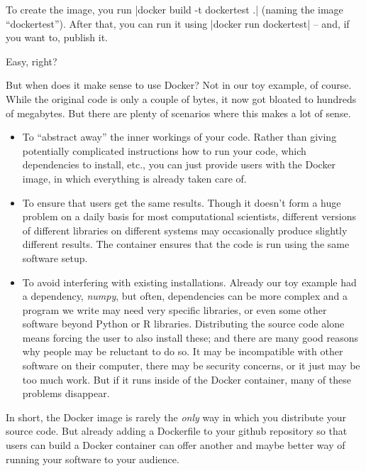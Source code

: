 To create the image, you run |docker build -t dockertest .| (naming
the image ``dockertest''). After that, you can run
it using |docker run dockertest| -- and, if you want to, publish it.

Easy, right?

But when does it make sense to use Docker? Not in our toy example,
of course. While the original code is only a couple of bytes, it now
got bloated to hundreds of megabytes. But there are plenty of
scenarios where this makes a lot of sense.

\begin{itemize}
\item To ``abstract away'' the inner workings of your code. Rather than giving potentially complicated instructions how to run your code, which dependencies to install, etc., you can just provide users with the Docker image, in which everything is already taken care of.
\item To ensure that users get the same results. Though it doesn't form a huge problem on a daily basis for most computational scientists, different versions of different libraries on different systems may occasionally produce slightly different results. The container ensures that the code is run using the same software setup.
\item To avoid interfering with existing installations. Already our toy example had a dependency, \emph{numpy}, but often, dependencies can be more complex and a program we write may need very specific libraries, or even some other software beyond Python or R libraries. Distributing the source code alone means forcing the user to also install these; and there are many good reasons why people may be reluctant to do so. It may be incompatible with other software on their computer, there may be security concerns, or it just may be too much work. But if it runs inside of the Docker container, many of these problems disappear.
\end{itemize}

In short, the Docker image is rarely the \emph{only} way in which you distribute your source code. But already adding a Dockerfile to your github repository so that users can build a Docker container can offer another and maybe better way of running your software to your audience.


